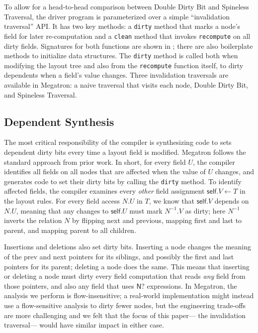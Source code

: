 To allow for a head-to-head comparison
  between Double Dirty Bit and Spineless Traversal,
  the driver program is parameterized over
  a simple ``invalidation traversal'' API.
It has two key methods:
  a \texttt{dirty} method
  that marks a node's field for later re-computation
  and a \texttt{clean} method
  that invokes \texttt{recompute} on all dirty fields.
Signatures for both functions are shown
  in ;
  there are also boilerplate methods
  to initialize data structures.
The \texttt{dirty} method is called
  both when modifying the layout tree
  and also from the \texttt{recompute} function itself,
  to dirty dependents when a field's value changes.
Three invalidation traversals are available in Megatron:
  a naive traversal that visits each node,
  Double Dirty Bit, and Spineless Traversal.

\subsection{Dependent Synthesis}

The most critical responsibility of the compiler
  is synthesizing code to sets dependent dirty bits
  every time a layout field is modified.
Megatron follows the standard approach from prior work.
In short, for every field $U$,
  the compiler identifies all fields on all nodes
  that are affected when the value of $U$ changes,
  and generates code to set their dirty bits
  by calling the \texttt{dirty} method.
To identify affected fields,
  the compiler examines every \emph{other} field assignment
  $\mathsf{self}.V \gets T$ in the layout rules.
For every field access $N.U$ in $T$,
  we know that $\mathsf{self}.V$ depends on $N.U$,
  meaning that any changes to $\mathsf{self}.U$
  must mark $N^{-1}.V$ as dirty;
  here $N^{-1}$ inverts the relation $N$ by
  flipping \textsf{next} and \textsf{previous},
  mapping \textsf{first} and \textsf{last} to \textsf{parent},
  and mapping \textsf{parent} to all children.

Insertions and deletions also set dirty bits.
Inserting a node changes the meaning
  of the \textsf{prev} and \textsf{next} pointers
  for its siblings, and possibly
  the \textsf{first} and \textsf{last} pointers
  for its parent;
  deleting a node does the same.
This means that inserting or deleting a node
  must dirty every field computation
  that reads \emph{any} field from those pointers,
  and also any field that uses $\mathsf{N?}$ expressions.
In Megatron, the analysis we perform is flow-insensitive;
  a real-world implementation might instead use
  a flow-sensitive analysis to dirty fewer nodes,
  but the engineering trade-offs are more challenging
  and we felt that the focus of this paper---%
  the invalidation traversal---%
  would have similar impact in either case.

